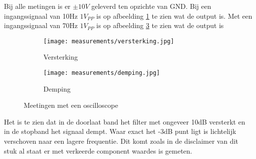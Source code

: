 \noindent
Bij alle metingen is er $\pm 10V$ geleverd ten opzichte van GND. Bij een ingangssignaal van 10Hz $1V_{PP}$ is op afbeelding \ref{fig:amp} te zien wat de output is.
Met een ingangssignaal van 70Hz $1V_{PP}$ is op afbeelding \ref{fig:atten} te zien wat de output is
\begin{figure}[!hbt]
	\begin{subfigure}{0.5\textwidth}
		\texttt{[image: measurements/versterking.jpg]}
		\caption{Versterking}
		\label{fig:amp}
	\end{subfigure}
	\begin{subfigure}{0.5\textwidth}
		\texttt{[image: measurements/demping.jpg]}
		\caption{Demping}
		\label{fig:atten}
	\end{subfigure}
	\caption{Meetingen met een oscilloscope}
\end{figure}

\noindent
Het is te zien dat in de doorlaat band het filter met ongeveer 10dB versterkt en in de stopband het signaal dempt. Waar exact het -3dB punt ligt is 
lichtelijk verschoven naar een lagere frequentie. Dit komt zoals in de disclaimer van dit stuk al staat er met verkeerde component waardes is gemeten.